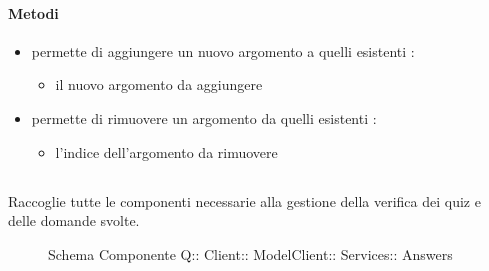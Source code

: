 \paragraph{Metodi}
\begin{itemize}
\item {}
\newline
permette di aggiungere un nuovo argomento a quelli esistenti
\newline
{} :
\begin{itemize}
\item {}
\newline
il nuovo argomento da aggiungere
\end{itemize}
\item {}
\newline
permette di rimuovere un argomento da quelli esistenti
\newline
{} :
\begin{itemize}
\item {}
\newline
l'indice dell'argomento da rimuovere
\end{itemize}
\end{itemize}
\subsection{}
Raccoglie tutte le componenti necessarie alla gestione della verifica dei quiz e delle domande svolte.
\begin{figure}[H]
\centering
\noindent{}
\caption[Schema Componente Quizzipedia::Client::ModelClient::Services::Answers]{Schema Componente Q:: Client:: ModelClient:: Services:: Answers}
\end{figure}
